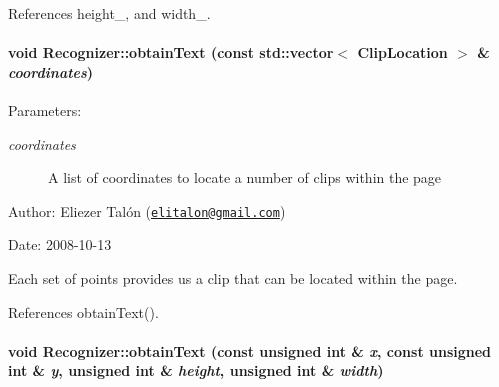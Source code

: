 References height\_\-, and width\_\-.\hypertarget{class_recognizer_4b3b27b3746edcf831d142eddfb81f19}{
\paragraph[obtainText]{\setlength{\rightskip}{0pt plus 5cm}void Recognizer::obtainText (const std::vector$<$ {\bf ClipLocation} $>$ \& {\em coordinates})}\hfill}
\label{class_recognizer_4b3b27b3746edcf831d142eddfb81f19}


\begin{Desc}
\item[Parameters:]
\begin{description}
\item[{\em coordinates}]A list of coordinates to locate a number of clips within the page\end{description}
\end{Desc}
\begin{Desc}
\item[Author:]Eliezer Talón (\href{mailto:elitalon@gmail.com}{\tt elitalon@gmail.com}) \end{Desc}
\begin{Desc}
\item[Date:]2008-10-13\end{Desc}
Each set of points provides us a clip that can be located within the page. 

References obtainText().\hypertarget{class_recognizer_d117f344b1f77711e6cbab0f15dbc269}{
\paragraph[obtainText]{\setlength{\rightskip}{0pt plus 5cm}void Recognizer::obtainText (const unsigned int \& {\em x}, \/  const unsigned int \& {\em y}, \/  unsigned int \& {\em height}, \/  unsigned int \& {\em width})}\hfill}
\label{class_recognizer_d117f344b1f77711e6cbab0f15dbc269}


